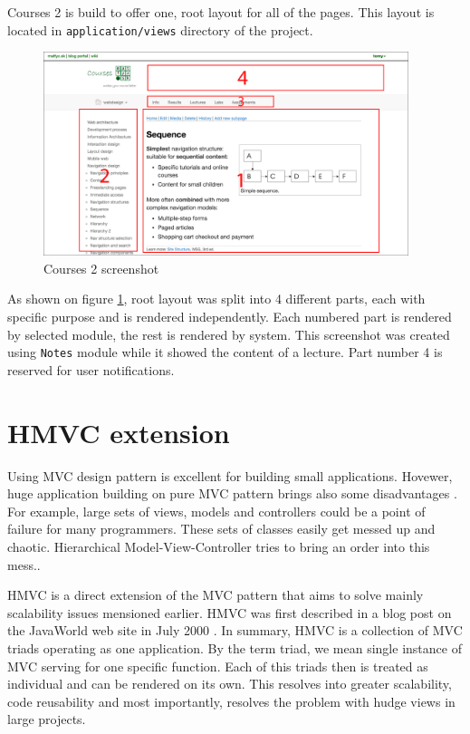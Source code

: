 Courses 2 is build to offer one, root layout for all of the pages. This layout is located in \texttt{application/views} directory of the project.

\begin{figure}[h]
    \centering
    \includegraphics[width=0.95\textwidth]{images/courses-labelled.png}
    \caption{Courses 2 screenshot}
    \label{courses2screen}
\end{figure}


As shown on figure \ref{courses2screen}, root layout was split into 4 different parts, each with specific purpose and is rendered independently. Each numbered part is rendered by selected module, the rest is rendered by system. This screenshot was created using \texttt{Notes} module while it showed the content of a lecture. Part number 4 is reserved for user notifications.

\section{HMVC extension}
Using MVC design pattern is excellent for building small applications. Hovewer, huge application building on pure MVC pattern brings also some disadvantages \cite{culik}. For example, large sets of views, models and controllers could be a point of failure for many programmers. These sets of classes easily get messed up and chaotic. Hierarchical Model-View-Controller tries to bring an order into this mess.\cite{hmvc}.

HMVC is a direct extension of the MVC pattern that aims to solve mainly scalability issues mensioned earlier. HMVC was first described in a blog post on the JavaWorld web site in July 2000 \cite{hmvc}. In summary, HMVC is a collection of MVC triads operating as one application. By the term triad, we mean single instance of MVC serving for one specific function. Each of this triads then is treated as individual and can be rendered on its own. This resolves into greater scalability, code reusability and most importantly, resolves the problem with hudge views in large projects.

